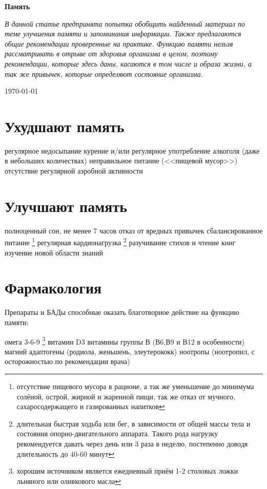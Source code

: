 \documentclass[12pt]{article}			%
\begin{document}
\begin{center}
	\Huge{\textbf{Память}}
\end{center}

\hfill

\noindent
\textit{В данной статье предпринята попытка обобщить найденный материал по теме улучшения памяти и запоминания информации. Также предлагаются общие рекомендации проверенные на практике. Функцию памяти нельзя рассматривать в отрыве от здоровья организма в целом, поэтому рекомендации, которые здесь даны, касаются в том числе и образа жизни, а так же привычек, которые определяют состояние организма.}

\begin{flushright}
	\today
\end{flushright}
\hfill
	
\section{Ухудшают память}
\begin{outline}[itemize]
	\1 регулярное недосыпание
	\1 курение и/или регулярное употребление алкоголя (даже в небольших количествах)
	\1 неправильное питание (<<пищевой мусор>>)
	\1 отсутствие регулярной аэробной активности
\end{outline}

\section{Улучшают память}
\begin{outline}[itemize]
	\1 полноценный сон, не менее 7 часов
	\1 отказ от вредных привычек
	\1 сбалансированное питание \footnote{отсутствие пищевого мусора в рационе, а так же уменьшение до минимума солёной, острой, жирной и жаренной пищи, так же отказ от мучного, сахаросодержащего и газированных напитков}
	\1 регулярная кардионагрузка \footnote{длительная быстрая ходьба или бег, в зависимости от общей массы тела и состояния опорно-двигательного аппарата. Такого рода нагрузку рекомендуется давать через день или 3 раза в неделю, постепенно доводя длительность до 40-60 минут}
	\1 разучивание стихов и чтение книг
	\1 изучение новой области знаний
\end{outline}

\section{Фармакология}
Препараты и БАДы способные оказать благотворное действие на функцию памяти:
\begin{outline}[itemize]
	\1 омега 3-6-9 \footnote{хорошим источником является ежедневный приём 1-2 столовых ложки льняного или оливкового масла}
	\1 витамин D3
	\1 витамины группы В (В6,В9 и В12 в особенности)
	\1 магний
	\1 адаптогены (родиола, женьшень, элеутерококк)
	\1 ноотропы (ноотропил, с осторожностью по рекомендации врача)
\end{outline}
	
\end{document}
